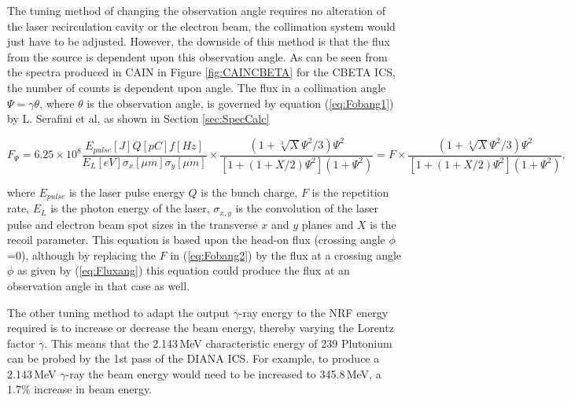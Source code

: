 \documentclass[11pt]{article}
\begin{document}
The tuning method of changing the observation angle requires no alteration of the laser recirculation cavity or the electron beam, the collimation system would just have to be adjusted. However, the downside of this method is that the flux from the source is dependent upon this observation angle. As can be seen from the spectra produced in CAIN in Figure \ref{fig:CAINCBETA} for the CBETA ICS, the number of counts is dependent upon angle. The flux in a collimation angle $\Psi = \gamma\theta$, where $\theta$ is the observation angle, is governed by equation (\ref{eq:Fobang1}) by L. Serafini et al, as shown in Section \ref{sec:SpecCalc} 

\begin{equation}
F_{\Psi} = 6.25\times 10^{8}\frac{E_{pulse}[J]Q[pC]f[Hz]}{E_{L}[eV]\sigma_{x}[\mu m]\sigma_{y}[\mu m]} \times \frac{\left(1+\sqrt[3]{X}\Psi^{2}/3\right)\Psi^{2}}{\left[1+\left(1+X/2\right)\Psi^{2}\right]\left(1+\Psi^{2}\right)} = F \times \frac{\left(1+\sqrt[3]{X}\Psi^{2}/3\right)\Psi^{2}}{\left[1+\left(1+X/2\right)\Psi^{2}\right]\left(1+\Psi^{2}\right)} ,
\label{eq:Fobang2}
\end{equation}

\noindent where $E_{pulse}$ is the laser pulse energy $Q$ is the bunch charge, $F$ is the repetition rate, $E_{L}$ is the photon energy of the laser, $\sigma_{x,y}$ is the convolution of the laser pulse and electron beam spot sizes in the transverse $x$ and $y$ planes and $X$ is the recoil parameter. This equation is based upon the head-on flux (crossing angle $\phi$=0), although by replacing the $F$ in (\ref{eq:Fobang2}) by the flux at a crossing angle $\phi$ as given by (\ref{eq:Fluxang}) this equation could produce the flux at an observation angle in that case as well.  

The other tuning method to adapt the output $\gamma$-ray energy to the NRF energy required is to increase or decrease the beam energy, thereby varying the Lorentz factor $\gamma$. This means that the 2.143\,MeV characteristic energy of 239 Plutonium can be probed by the 1st pass of the DIANA ICS. For example, to produce a 2.143\,MeV $\gamma$-ray the beam energy would need to be increased to 345.8\,MeV, a 1.7\% increase in beam energy.
\end{document}
